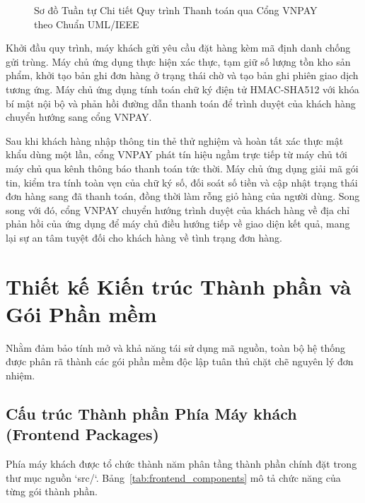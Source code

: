 \begin{figure}[htbp]
\caption{Sơ đồ Tuần tự Chi tiết Quy trình Thanh toán qua Cổng VNPAY theo Chuẩn UML/IEEE}
\label{fig:seq_payment}
\end{figure}

Khởi đầu quy trình, máy khách gửi yêu cầu đặt hàng kèm mã định danh chống gửi trùng. Máy chủ ứng dụng thực hiện xác thực, tạm giữ số lượng tồn kho sản phẩm, khởi tạo bản ghi đơn hàng ở trạng thái chờ và tạo bản ghi phiên giao dịch tương ứng. Máy chủ ứng dụng tính toán chữ ký điện tử HMAC-SHA512 với khóa bí mật nội bộ và phản hồi đường dẫn thanh toán để trình duyệt của khách hàng chuyển hướng sang cổng VNPAY.

Sau khi khách hàng nhập thông tin thẻ thử nghiệm và hoàn tất xác thực mật khẩu dùng một lần, cổng VNPAY phát tín hiệu ngầm trực tiếp từ máy chủ tới máy chủ qua kênh thông báo thanh toán tức thời. Máy chủ ứng dụng giải mã gói tin, kiểm tra tính toàn vẹn của chữ ký số, đối soát số tiền và cập nhật trạng thái đơn hàng sang đã thanh toán, đồng thời làm rỗng giỏ hàng của người dùng. Song song với đó, cổng VNPAY chuyển hướng trình duyệt của khách hàng về địa chỉ phản hồi của ứng dụng để máy chủ điều hướng tiếp về giao diện kết quả, mang lại sự an tâm tuyệt đối cho khách hàng về tình trạng đơn hàng.

\section{Thiết kế Kiến trúc Thành phần và Gói Phần mềm}
Nhằm đảm bảo tính mở và khả năng tái sử dụng mã nguồn, toàn bộ hệ thống được phân rã thành các gói phần mềm độc lập tuân thủ chặt chẽ nguyên lý đơn nhiệm.

\subsection{Cấu trúc Thành phần Phía Máy khách (Frontend Packages)}
Phía máy khách được tổ chức thành năm phân tầng thành phần chính đặt trong thư mục nguồn `src/`. Bảng~\ref{tab:frontend_components} mô tả chức năng của từng gói thành phần.


